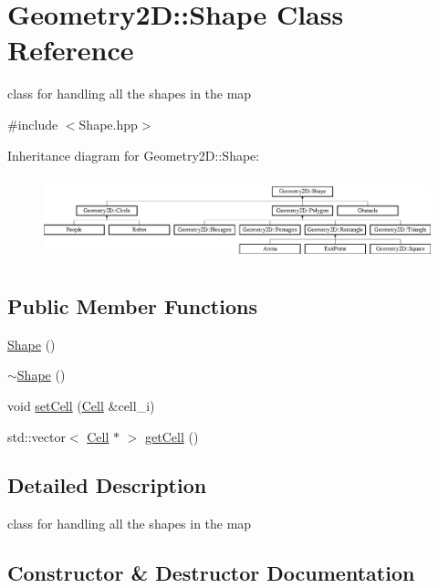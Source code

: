 \hypertarget{class_geometry2_d_1_1_shape}{}\section{Geometry2D\+:\+:Shape Class Reference}
\label{class_geometry2_d_1_1_shape}


class for handling all the shapes in the map  




{\ttfamily \#include $<$Shape.\+hpp$>$}

Inheritance diagram for Geometry2D\+:\+:Shape\+:\begin{figure}[H]
\begin{center}
\leavevmode
\includegraphics[height=2.456141cm]{class_geometry2_d_1_1_shape}
\end{center}
\end{figure}
\subsection*{Public Member Functions}
\begin{DoxyCompactItemize}
\item 
\mbox{\hyperlink{class_geometry2_d_1_1_shape_a22028a42d94c013c15909c2601ace514}{Shape}} ()
\item 
\mbox{\hyperlink{class_geometry2_d_1_1_shape_ad475fc843313521e75906737ecd7f459}{$\sim$\+Shape}} ()
\item 
void \mbox{\hyperlink{class_geometry2_d_1_1_shape_a25ec0d592589f6205012c84828b33fb3}{set\+Cell}} (\mbox{\hyperlink{class_cell}{Cell}} \&cell\+\_\+i)
\item 
std\+::vector$<$ \mbox{\hyperlink{class_cell}{Cell}} $\ast$ $>$ \mbox{\hyperlink{class_geometry2_d_1_1_shape_a561811570c6e3efd024a048556ca370f}{get\+Cell}} ()
\end{DoxyCompactItemize}


\subsection{Detailed Description}
class for handling all the shapes in the map 

\subsection{Constructor \& Destructor Documentation}
\mbox{\label{class_geometry2_d_1_1_shape_a22028a42d94c013c15909c2601ace514}} 
